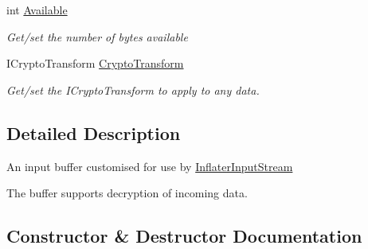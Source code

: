\begin{DoxyCompactItemize}
int \hyperlink{class_i_c_sharp_code_1_1_sharp_zip_lib_1_1_zip_1_1_compression_1_1_streams_1_1_inflater_input_buffer_a80ed1070d289a5ed6eca89c415459ff0}{Available}
\begin{DoxyCompactList}\small\item\em Get/set the number of bytes available \end{DoxyCompactList}\item 
I\+Crypto\+Transform \hyperlink{class_i_c_sharp_code_1_1_sharp_zip_lib_1_1_zip_1_1_compression_1_1_streams_1_1_inflater_input_buffer_a67520d7f77f40b65e65e7d859be9feea}{Crypto\+Transform}
\begin{DoxyCompactList}\small\item\em Get/set the I\+Crypto\+Transform to apply to any data. \end{DoxyCompactList}\end{DoxyCompactItemize}


\subsection{Detailed Description}
An input buffer customised for use by \hyperlink{class_i_c_sharp_code_1_1_sharp_zip_lib_1_1_zip_1_1_compression_1_1_streams_1_1_inflater_input_stream}{Inflater\+Input\+Stream} 

The buffer supports decryption of incoming data. 

\subsection{Constructor \& Destructor Documentation}
\mbox{\label{class_i_c_sharp_code_1_1_sharp_zip_lib_1_1_zip_1_1_compression_1_1_streams_1_1_inflater_input_buffer_a29ccbb3fa15cead58316762cfa37bd52}} 
